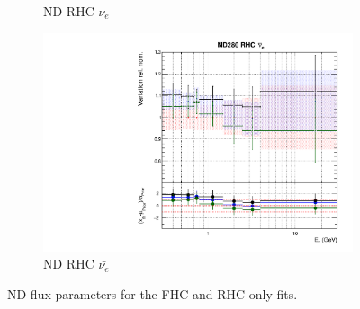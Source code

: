 \begin{figure}
\begin{subfigure}{0.45\textwidth}
  \caption{ND RHC $\nu_e$}
\end{subfigure}
\begin{subfigure}{0.45\textwidth}
  \centering
  \includegraphics[width=0.75\linewidth]{figs/fhcrhcfitsflux_7}
  \caption{ND RHC $\bar{\nu_e}$}
\end{subfigure}
\caption{ND flux parameters for the FHC and RHC only fits.}
\label{fig:fhcrhcfluxND}
\end{figure}

